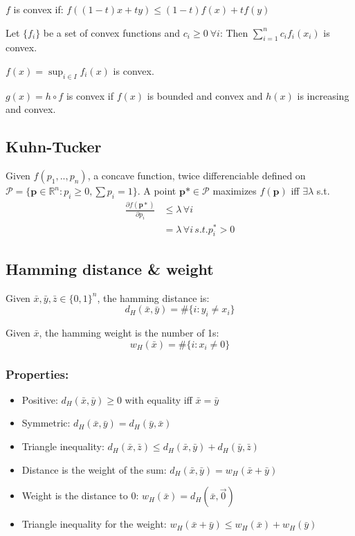 \documentclass[10pt,a4paper,landscape]{article}
\begin{document}
\begin{multicols*}{4}
$f$ is convex if: $f((1-t)x+ t y)\leq (1-t) f(x)+ t f(y)$

Let $\{f_i\}$ be a set of convex functions and $c_i \geq 0 \ \forall i$:
Then $\sum_{i=1}^n c_i f_i(x_i)$ is convex.

$f(x) = \sup_{i \in I} f_i(x)$ is convex.

$g(x) = h \circ f$ is convex if $f(x)$ is bounded and convex and $h(x)$ is increasing and convex.

\subsection{Kuhn-Tucker}
Given $f(p_1,..,p_n)$, a concave function, twice differenciable defined on $\mathcal{P} = \{\boldsymbol p \in \mathbb{R}^n : p_i \geq 0, \sum p_i = 1\}$. A point $\boldsymbol p* \in \mathcal{P}$ maximizes $f(\boldsymbol p)$ iff $\exists \lambda$ s.t.
\begin{align*}
 \frac{\partial f(\boldsymbol p*)}{\partial p_i} 	& \leq \lambda \, \forall i \\
							& = \lambda \, \forall i \, s.t. p_i^* > 0
\end{align*}

\subsection{Hamming distance \& weight}
Given $\bar{x}, \bar{y}, \bar{z} \in \{0,1\}^n$, the hamming distance is:
$$d_H(\bar{x},\bar{y}) = \#\{i:y_i \neq x_i\}$$

Given $\bar x$, the hamming weight is the number of 1s:
$$w_H(\bar{x}) = \#\{i: x_i \neq 0\}$$

\subsubsection{Properties:}
\begin{itemize}
	 \item Positive: $d_H(\bar{x},\bar{y}) \geq 0$ with equality iff $\bar{x} = \bar{y}$
	 \item Symmetric: $d_H(\bar{x},\bar{y}) = d_H(\bar{y},\bar{x})$
	 \item Triangle inequality: $d_H(\bar{x},\bar{z}) \leq d_H(\bar{x},\bar{y}) + d_H(\bar{y},\bar{z})$
	 \item Distance is the weight of the sum: $d_H(\bar{x},\bar{y}) = w_H(\bar x + \bar y)$
	 \item Weight is the distance to 0:
	 $w_H(\bar x) = d_H(\bar x, \vec 0)$
	 \item Triangle inequality for the weight:
	 $w_H(\bar x + \bar y) \leq w_H(\bar x) + w_H(\bar y)$
\end{itemize}

\end{multicols*}
\end{document}
